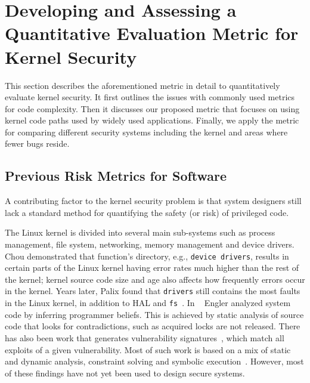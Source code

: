\section{Developing and Assessing a Quantitative Evaluation Metric for
Kernel Security}
\label{sec.metric}
 
This section describes the aforementioned metric in detail to 
quantitatively evaluate kernel security. It first outlines the issues with
commonly used metrics for code complexity. Then it discusses our proposed metric that
focuses on using kernel code paths used by %
widely used applications. Finally, we
apply the metric %
for comparing different security systems including the kernel and areas where fewer bugs reside.

\subsection{Previous Risk Metrics for Software}

A contributing factor to the kernel security problem is that system
designers 
still lack a standard method for quantifying the safety (or risk) of
privileged code.   


The Linux kernel is divided into several main sub-systems such as %
process management, file system, networking, memory management and device drivers.
Chou %
\cite{PittSFIeld} demonstrated that function's directory, e.g., 
\texttt{device drivers}, results in certain parts of the Linux kernel having error rates much 
higher than the rest of the kernel; kernel source code size and age also affects
how frequently errors occur in the kernel.
Years later, Palix found that \texttt{drivers} still contains the most faults in 
the Linux kernel, in addition to HAL and \texttt{fs}~\cite{palix2011faults}. 
In ~\cite{engler2001bugs} Engler analyzed system code by inferring programmer 
beliefs. This is achieved by static analysis
of source code that looks for contradictions, such as acquired locks are 
not released. There has also been work that generates vulnerability 
signatures~\cite{brumley2006towards}, which match all exploits
of a given vulnerability. Most of such work is based on a mix of static and
dynamic analysis, constraint solving and symbolic execution~\cite{chou2003static}.
However, most of these findings have not yet been used to design 
secure systems. 

